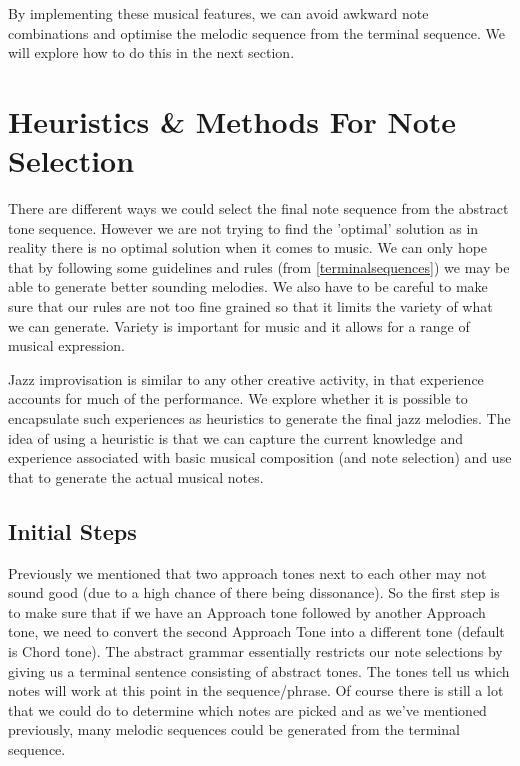 \documentclass[pdftex,12pt,a4paper]{report}
\begin{document}
By implementing these musical features, we can avoid awkward note combinations and optimise the melodic sequence from the terminal sequence. We will explore how to do this in the next section.


\section{Heuristics \& Methods For Note Selection}
There are different ways we could select the final note sequence from the abstract tone sequence. However we are not trying to find the 'optimal' solution as in reality there is no optimal solution when it comes to music. We can only hope that by following some guidelines and rules (from \ref{terminalsequences}) we may be able to generate better sounding melodies. We also have to be careful to make sure that our rules are not too fine grained so that it limits the variety of what we can generate. Variety is important for music and it allows for a range of musical expression.

Jazz improvisation is similar to any other creative activity, in that experience accounts for much of the performance. We explore whether it is possible to encapsulate such experiences as heuristics to generate the final jazz melodies. The idea of using a heuristic is that we can capture the current knowledge and experience associated with basic musical composition (and note selection) and use that to generate the actual musical notes. 

\subsection{Initial Steps}
Previously we mentioned that two approach tones next to each other may not sound good (due to a high chance of there being dissonance). So the first step is to make sure that if we have an Approach tone followed by another Approach tone, we need to convert the second Approach Tone into a different tone (default is Chord tone).
The abstract grammar essentially restricts our note selections by giving us a terminal sentence consisting of abstract tones. The tones tell us which notes will work at this point in the sequence/phrase. Of course there is still a lot that we could do to determine which notes are picked and as we've mentioned previously, many melodic sequences could be generated from the terminal sequence. 
\end{document}
